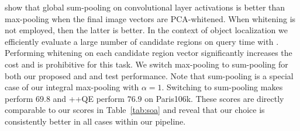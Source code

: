 \cite{BL15} show that global sum-pooling on convolutional layer activations is better than max-pooling when the final image vectors are PCA-whitened. 
When whitening is not employed, then the latter is better.
In the context of object localization we efficiently evaluate a large number of candidate regions on query time with \deeploc.
Performing whitening on each candidate region vector significantly increases the cost and is prohibitive for this task.
We switch max-pooling to sum-pooling for both our proposed \rfv and \deeploc and test performance. Note that sum-pooling is a special case of our integral max-pooling with $\alpha=1$.
Switching to sum-pooling makes \rfv perform $69.8$ and \rfv+\deeploc+QE perform $76.9$ on Paris106k. These scores are directly comparable to our scores in Table~\ref{tab:soa} and reveal that our choice is consistently better in all cases within our pipeline.
